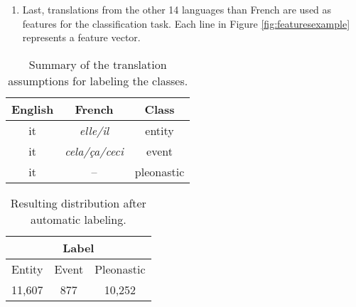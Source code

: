 \documentclass[10pt, a4paper]{article} \usepackage{lrec} \usepackage{multibib}
\begin{document}
\begin{enumerate}
For the expletives, we took all instances of `it' analyzed as expletives in the
parsed files. These files have been processed using universal dependencies v2.0
(UDPipe parser, models from 2017-08-01), which includes the dedicated dependency
relation \texttt{expl} \cite{bouma-etal-2018-expletives}.

Taking advantage of the parallel data, we decided to use French as a seed language, and
consider all instances translated with the neutral demonstrative pronouns
\textit{cela}, \textit{ceci} or \textit{ça} as events. In French, these pronoun
are typically used to reference proposition or phrases. For the entity nominal
case, we took the French translations \textit{elle} and \textit{il}. From 69,431
`it' pronouns, we labeled 22,574 instances, corresponding to approximately 30\%
(Tables \ref{tab:classrules} and \ref{tab:resultinglabels}).

\item Last, translations from the other 14 languages than French are used as features for
the classification task. Each line in Figure \ref{fig:featuresexample}
represents a feature vector.

\end{enumerate}




\begin{table}\centering \begin{tabular}{ccc} \toprule \textbf{English} &
\textbf{French} &  \textbf{Class} \\ \midrule it &  \textit{elle/il}  & entity\\
it & \textit{cela/ça/ceci} & event  \\ it  &  -- &pleonastic \\
\bottomrule
\end{tabular} 
\caption{Summary of the translation assumptions for labeling the
classes. }\label{tab:classrules} 
\end{table}



\begin{table}[h!]\centering \begin{tabular}{ccc}
\multicolumn{3}{c}{\textbf{Label}}\\ 
\toprule 
Entity & Event & Pleonastic \\
\midrule 
11,607 & 877 &10,252\\ 
\bottomrule 
\end{tabular} 
\caption{Resulting
distribution after automatic labeling.}\label{tab:resultinglabels} 
\end{table}
\end{document}
